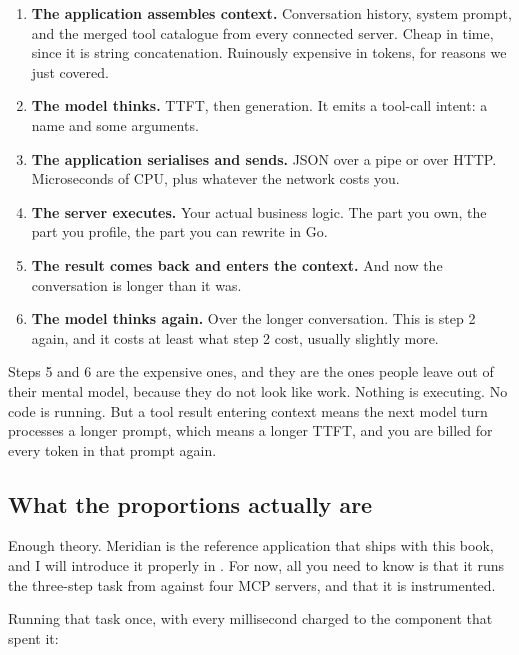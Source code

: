 \begin{enumerate}[leftmargin=1.6em, itemsep=4pt]
\item \textbf{The application assembles context.} Conversation history, system
prompt, and the merged tool catalogue from every connected server. Cheap in
time, since it is string concatenation. Ruinously expensive in tokens, for
reasons we just covered.

\item \textbf{The model thinks.} TTFT, then generation. It emits a tool-call
intent: a name and some arguments.

\item \textbf{The application serialises and sends.} JSON over a pipe or over
HTTP. Microseconds of CPU, plus whatever the network costs you.

\item \textbf{The server executes.} Your actual business logic. The part you
own, the part you profile, the part you can rewrite in Go.

\item \textbf{The result comes back and enters the context.} And now the
conversation is longer than it was.

\item \textbf{The model thinks again.} Over the longer conversation. This is
step 2 again, and it costs at least what step 2 cost, usually slightly more.
\end{enumerate}

Steps 5 and 6 are the expensive ones, and they are the ones people leave out of
their mental model, because they do not look like work. Nothing is executing.
No code is running. But a tool result entering context means the next model turn
processes a longer prompt, which means a longer TTFT, and you are billed for
every token in that prompt again.

\subsection{What the proportions actually are}

Enough theory. Meridian is the reference application that ships with this book,
and I will introduce it properly in . For now, all you need to
know is that it runs the three-step task from  against
four MCP servers, and that it is instrumented.

Running that task once, with every millisecond charged to the component that
spent it:

